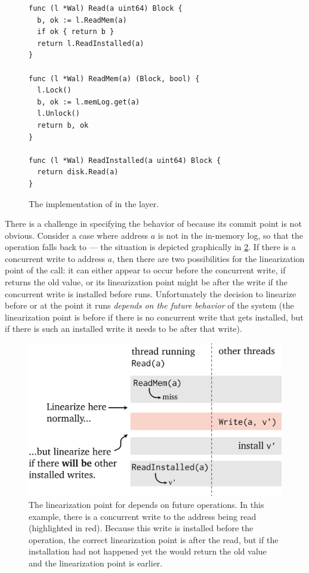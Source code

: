 \begin{figure}[ht]
\begin{verbatim}
func (l *Wal) Read(a uint64) Block {
  b, ok := l.ReadMem(a)
  if ok { return b }
  return l.ReadInstalled(a)
}

func (l *Wal) ReadMem(a) (Block, bool) {
  l.Lock()
  b, ok := l.memLog.get(a)
  l.Unlock()
  return b, ok
}

func (l *Wal) ReadInstalled(a uint64) Block {
  return disk.Read(a)
}
\end{verbatim}
\caption{The implementation of  in the  layer.}
\label{fig:walread}
\end{figure}

There is a challenge in specifying the behavior of  because its commit
point is not obvious. Consider a case
where address $a$ is not in the in-memory log, so that the  operation
falls back to  --- the situation is depicted graphically in
\cref{fig:wal:future-read}. If there is a concurrent write to address
$a$, then there are two possibilities for the linearization point of the
 call: it can either appear to occur before the concurrent write, if
 returns the old value, or its linearization point might be
after the write if the concurrent write is installed before
 runs. Unfortunately the decision to linearize before
 or at the point it runs \emph{depends on the future
  behavior} of the system (the linearization point is before if there is no
concurrent write that gets installed, but if there is such an installed write it
needs to be after that write).

\begin{figure}[ht]
\includegraphics{fig/future-read.png}
\caption[Future-dependent linearization point for WAL's Read operation]{The
linearization point for  depends on future operations. In
this example, there is a concurrent write to the address being read
(highlighted in red). Because this write is installed before the
 operation, the correct linearization point is after the read,
but if the installation had not happened yet the  would return the old
value and the linearization point is earlier.}
\label{fig:wal:future-read}
\end{figure}

